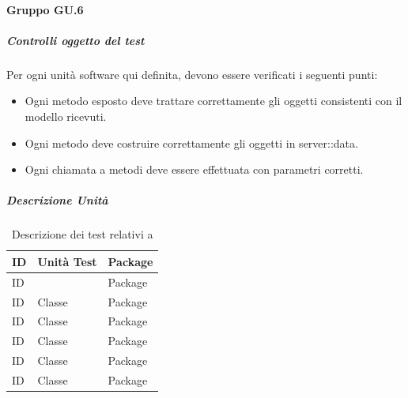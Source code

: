 \documentclass[12pt,a4paper]{article}
\begin{document}
\paragraph{Gruppo GU.6}
\subparagraph{Controlli oggetto del test}
Per ogni unità software qui definita, devono essere verificati i seguenti punti:
\begin{itemize}
	\item Ogni metodo esposto deve trattare correttamente gli oggetti consistenti con il modello ricevuti.
	\item Ogni metodo deve costruire correttamente gli oggetti in server::data.
	\item Ogni chiamata a metodi deve essere effettuata con parametri corretti.
\end{itemize}
\subparagraph{Descrizione Unità}
\begin{table}[H]
	\begin{center}
		\begin{tabular}{p{} p{} p{}}
			\toprule
			\textbf{ID}   & \textbf{Unità Test}	& \textbf{Package} \\ \midrule
			\midrule
			ID &  & Package\\ \midrule
			ID & Classe & Package\\ \midrule
			ID & Classe & Package\\ \midrule
			ID & Classe & Package\\ \midrule
			ID & Classe & Package\\ \midrule
			ID & Classe & Package\\ \midrule
			
			\bottomrule
		\end{tabular}
	\end{center}
	\caption{Descrizione dei test relativi a \TODO{}}
\end{table}
\end{document}
